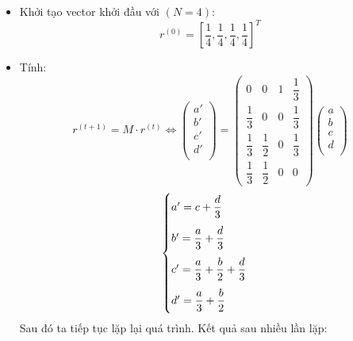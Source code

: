             \begin{itemize}
                \item Khởi tạo vector khởi đầu với $(N = 4)$: 
                $$
                    r^{(0)} = \left[\frac{1}{4},\frac{1}{4},\frac{1}{4},\frac{1}{4}\right] ^ T 
                $$
                \item Tính: 
                $$
                r^{(t+1)} = M \cdot r^{(t)} 
                \Leftrightarrow
                \begin{pmatrix}
                    a' \\[12pt]
                    b' \\[12pt]
                    c' \\[12pt]
                    d' \\
                \end{pmatrix}
                =
                \begin{pmatrix}
                    0 & 0 & 1 & \dfrac{1}{3} \\[10pt]
                    \dfrac{1}{3} & 0 & 0 & \dfrac{1}{3} \\[10pt]
                    \dfrac{1}{3} & \dfrac{1}{2} & 0 & \dfrac{1}{3} \\[10pt]
                    \dfrac{1}{3} & \dfrac{1}{2} & 0 & 0
                \end{pmatrix}
                \begin{pmatrix}
                    a \\[12.5pt]
                    b \\[12.5pt]
                    c \\[12.5pt]
                    d \\
                \end{pmatrix}
                $$
                $$
                \begin{cases}
                    a' = c + \dfrac{d}{3}\\[10pt]
                    b' = \dfrac{a}{3} + \dfrac{d}{3}\\[10pt]
                    c' = \dfrac{a}{3} + \dfrac{b}{2} + \dfrac{d}{3}\\[10pt]
                    d' = \dfrac{a}{3} + \dfrac{b}{2}
                \end{cases}\\[10pt]
                $$
                Sau đó ta tiếp tục lặp lại quá trình. Kết quả sau nhiều lần lặp:

\end{itemize}

